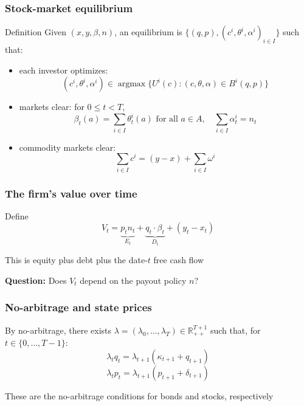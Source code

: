 \documentclass[blue]{beamer}
\def\R{\mathbb{R}}
\def\leq{\leqslant}
\DeclareMathOperator\argmax{argmax}
\theoremstyle{definition}
\theoremstyle{example}
\begin{document}
\begin{frame}\frametitle{Stock-market equilibrium}
\begin{block}{Definition}
Given $(x, y, \beta, n)$, an equilibrium is $\{(q, p), (c^i, \theta^i, \alpha^i)_{i \in I}\}$ such that:
\end{block}
\begin{itemize}
\item[(a)] each investor optimizes:
\begin{equation*}
(c^i, \theta^i, \alpha^i) \in \argmax \{U^i(c) \colon (c, \theta, \alpha) \in B^i(q, p)\}
\end{equation*}
\item[(b)] markets clear: for $0 \leq t < T$,
\begin{equation*}
\beta_t(a) = \sum_{i \in I} \theta^i_t(a) \text{ for all $a \in A$}, \quad
\sum_{i \in I} \alpha^i_t = n_t
\end{equation*}
\item[(c)] commodity markets clear:
\begin{equation*}
\sum_{i \in I} c^i = (y - x) + \sum_{i \in I} \omega^i
\end{equation*}
\end{itemize}
\end{frame}

\begin{frame}\frametitle{The firm's value over time}
Define
\begin{equation*}
V_t = \underbrace{p_t n_t}_{\displaystyle E_t} + \underbrace{q_t \cdot \beta_t}_{\displaystyle D_t} + (y_t - x_t)
\end{equation*}
\bigskip

This is equity plus debt plus the date-$t$ free cash flow
\bigskip

\textbf{Question:} Does $V_t$ depend on the payout policy $n$?
\end{frame}

\begin{frame}\frametitle{No-arbitrage and state prices}
By no-arbitrage, there exists $\lambda = (\lambda_0, \ldots, \lambda_T) \in \R_{++}^{T+1}$ such that, for $t \in \{0, \ldots, T-1\}$:
\begin{equation*}
\lambda_t q_t = \lambda_{t+1} (\kappa_{t+1} + q_{t+1})
\end{equation*}
\begin{equation*}
\lambda_t p_t = \lambda_{t+1} (p_{t+1} + \delta_{t+1})
\end{equation*}
\bigskip

These are the no-arbitrage conditions for bonds and stocks, respectively
\end{frame}
\end{document}
